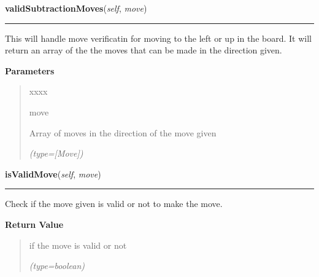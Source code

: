 \hspace{.8\funcindent}\begin{boxedminipage}{\funcwidth}

    \raggedright \textbf{validSubtractionMoves}(\textit{self}, \textit{move})

    \vspace{-1.5ex}

    \rule{\textwidth}{0.5\fboxrule}
\setlength{\parskip}{2ex}
    This will handle move verificatin for moving to the left or up in the 
    board. It will return an array of the the moves that can be made in the
    direction given.

\setlength{\parskip}{1ex}
      \textbf{Parameters}
      \vspace{-1ex}

      \begin{quote}
        \begin{Ventry}{xxxx}

          \item[move]

          Array of moves in the direction of the move given

            {\it (type=[Move])}

        \end{Ventry}

      \end{quote}

    \end{boxedminipage}

    \label{UnBlockMe:Map:Map:Map:isValidMove}

    \vspace{0.5ex}

\hspace{.8\funcindent}\begin{boxedminipage}{\funcwidth}

    \raggedright \textbf{isValidMove}(\textit{self}, \textit{move})

    \vspace{-1.5ex}

    \rule{\textwidth}{0.5\fboxrule}
\setlength{\parskip}{2ex}
    Check if the move given is valid or not to make the move.

\setlength{\parskip}{1ex}
      \textbf{Return Value}
    \vspace{-1ex}

      \begin{quote}
      if the move is valid or not

      {\it (type=boolean)}

      \end{quote}

    \end{boxedminipage}

